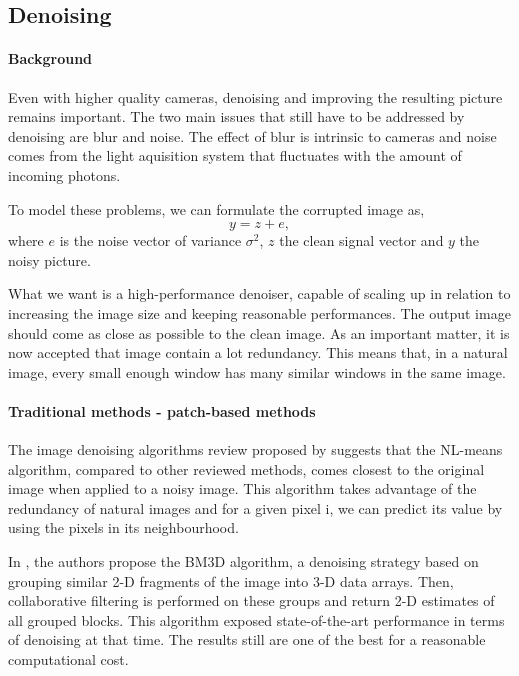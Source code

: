 \subsection{Denoising}

\paragraph{Background}

Even with higher quality cameras, denoising and improving the resulting picture remains important.
The two main issues that still have to be addressed by denoising are blur and noise.
The effect of blur is intrinsic to cameras and noise comes from the light aquisition system that fluctuates with the amount of incoming photons.

To model these problems, we can formulate the corrupted image as,
\[y = z + e,\]
where \(e\) is the noise vector of variance \(\sigma^2\), \(z\) the clean signal vector and \(y\) the noisy picture.

What we want is a high-performance denoiser, capable of scaling up in relation to increasing the image size and keeping reasonable performances.
The output image should come as close as possible to the clean image.
As an important matter, it is now accepted that image contain a lot redundancy.
This means that, in a natural image, every small enough window has many similar windows in the same image.

\paragraph{Traditional methods - patch-based methods}

The image denoising algorithms review proposed by \cite{buades_review_2005} suggests that the NL-means algorithm, compared to other reviewed methods, comes closest to the original image when applied to a noisy image.
This algorithm takes advantage of the redundancy of natural images and for a given pixel i, we can predict its value by using the pixels in its neighbourhood.

In \cite{dabov_image_2007}, the authors propose the BM3D algorithm, a denoising strategy based on grouping similar 2-D fragments of the image into 3-D data arrays. Then, collaborative filtering is performed on these groups and return 2-D estimates of all grouped blocks.
This algorithm exposed state-of-the-art performance in terms of denoising at that time. The results still are one of the best for a reasonable computational cost. 

